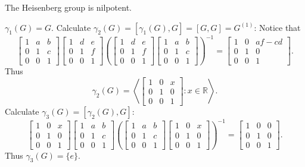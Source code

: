 \documentclass[12pt]{report}
\begin{document}
\begin{example}
The Heisenberg group is nilpotent.
\end{example}
\proof
$\gamma_1(G) = G$.
Calculate $\gamma_2(G) = [\gamma_1(G), G] = [G,G] = G^{(1)}$:  Notice that
\[
\begin{bmatrix}1 & a & b\\0 & 1 & c\\0 & 0 & 1\end{bmatrix}
\begin{bmatrix}1 & d & e\\0 & 1 & f\\0 & 0 & 1\end{bmatrix}
\left(\begin{bmatrix}1 & d & e\\0 & 1 & f\\0 & 0 & 1\end{bmatrix}\begin{bmatrix}1 & a & b\\0 & 1 & c\\0 & 0 & 1\end{bmatrix}\right)^{-1}
=\begin{bmatrix}1 & 0 & af-cd\\0 & 1 & 0\\0 & 0 & 1\end{bmatrix}.
\]
Thus
\[
\gamma_2(G) = \left<\begin{bmatrix}1 & 0 & x\\0 & 1 & 0\\0 & 0 & 1\end{bmatrix}: x\in\mathbb{R}\right>.
\]
Calculate $\gamma_3(G) = [\gamma_2(G),G]$:
\[
\begin{bmatrix}1 & 0 & x\\0 & 1 & 0\\0 & 0 & 1\end{bmatrix}
\begin{bmatrix}1 & a & b\\0 & 1 & c\\0 & 0 & 1\end{bmatrix}
\left(\begin{bmatrix}1 & a & b\\0 & 1 & c\\0 & 0 & 1\end{bmatrix}\begin{bmatrix}1 & 0 & x\\0 & 1 & 0\\0 & 0 & 1\end{bmatrix}\right)^{-1}
=\begin{bmatrix}1 & 0 & 0\\0 & 1 & 0\\0 & 0 & 1\end{bmatrix}.
\]
Thus $\gamma_3(G) = \{e\}$.
\done
\end{document}
